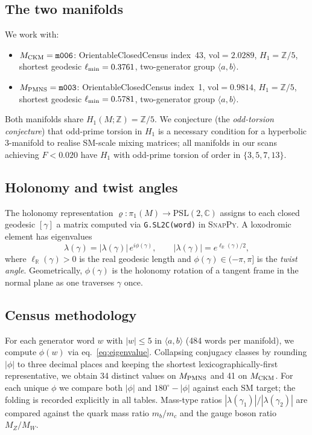 \documentclass[preprint,12pt,number]{elsarticle}
\newcommand{\PSL}{\mathrm{PSL}(2,\mathbb{C})}
\newcommand{\pioneM}{\pi_1(M)}
\newcommand{\mfld}[1]{\texttt{#1}}
\newcommand{\degr}{^{\circ}}
\begin{document}
\subsection{The two manifolds}

We work with:
\begin{itemize}
\item $M_{\rm CKM} = \mfld{m006}$: OrientableClosedCensus index~43,
      $\mathrm{vol}=2.0289$, $H_1=\mathbb{Z}/5$,
      shortest geodesic $\ell_{\rm min}=0.3761$,
      two-generator group $\langle a,b\rangle$.
\item $M_{\rm PMNS} = \mfld{m003}$: OrientableClosedCensus index~1,
      $\mathrm{vol}=0.9814$, $H_1=\mathbb{Z}/5$,
      shortest geodesic $\ell_{\rm min}=0.5781$,
      two-generator group $\langle a,b\rangle$.
\end{itemize}
Both manifolds share $H_1(M;\mathbb{Z})=\mathbb{Z}/5$.
We conjecture (the \emph{odd-torsion conjecture}) that odd-prime torsion
in $H_1$ is a necessary condition for a hyperbolic 3-manifold to realise
SM-scale mixing matrices; all manifolds in our scans achieving $F<0.020$
have $H_1$ with odd-prime torsion of order in $\{3,5,7,13\}$.

\subsection{Holonomy and twist angles}

The holonomy representation $\varrho:\pioneM\to\PSL$ assigns to each closed
geodesic $[\gamma]$ a matrix computed via \texttt{G.SL2C(word)} in \textsc{SnapPy}.
A loxodromic element has eigenvalues
\begin{equation}
  \lambda(\gamma) = |\lambda(\gamma)|\,e^{i\phi(\gamma)},\qquad
  |\lambda(\gamma)| = e^{\ell_{\mathbb{R}}(\gamma)/2},
  \label{eq:eigenvalue}
\end{equation}
where $\ell_{\mathbb{R}}(\gamma)>0$ is the real geodesic length and
$\phi(\gamma)\in(-\pi,\pi]$ is the \emph{twist angle}.
Geometrically, $\phi(\gamma)$ is the holonomy rotation of a tangent frame
in the normal plane as one traverses $\gamma$ once.

\subsection{Census methodology}

For each generator word $w$ with $|w|\leq 5$ in $\langle a,b\rangle$ (484 words per manifold),
we compute $\phi(w)$ via eq.~\eqref{eq:eigenvalue}.
Collapsing conjugacy classes by rounding $|\phi|$ to three decimal places and
keeping the shortest lexicographically-first representative, we obtain
34 distinct values on $M_{\rm PMNS}$ and 41 on $M_{\rm CKM}$.
For each unique $\phi$ we compare both $|\phi|$ and $180\degr-|\phi|$
against each SM target; the folding is recorded explicitly in all tables.
Mass-type ratios $|\lambda(\gamma_1)|/|\lambda(\gamma_2)|$ are compared against
the quark mass ratio $m_b/m_c$ and the gauge boson ratio $M_Z/M_W$.
\end{document}
